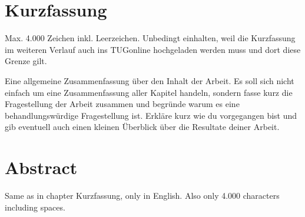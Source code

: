%
%
%
%

\section*{Kurzfassung}

Max. 4.000 Zeichen inkl. Leerzeichen. Unbedingt einhalten, weil die Kurzfassung im weiteren Verlauf auch ins TUGonline hochgeladen werden muss und dort diese Grenze gilt.

Eine allgemeine Zusammenfassung über den Inhalt der Arbeit. Es soll sich nicht einfach um eine Zusammenfassung aller Kapitel handeln, sondern fasse kurz die Fragestellung der Arbeit zusammen und begründe warum es eine behandlungswürdige Fragestellung ist. Erkläre kurz wie du vorgegangen bist und gib eventuell auch einen kleinen Überblick über die Resultate deiner Arbeit.

\newpage

\section*{Abstract}

Same as in chapter Kurzfassung, only in English. Also only 4.000 characters including spaces.




 
